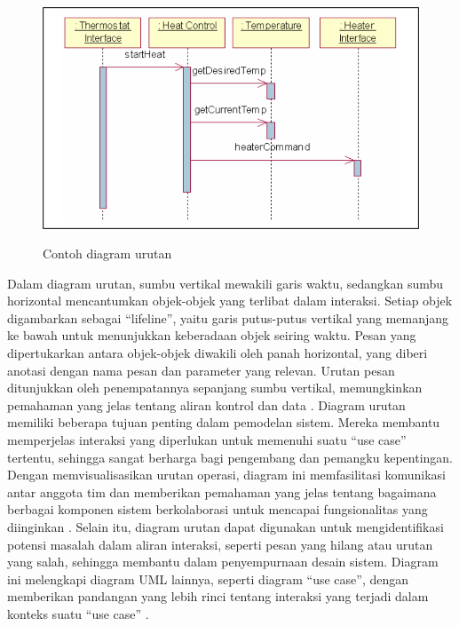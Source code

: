 \begin{figure}[htbp]
  \centering
  \includegraphics[width=0.85\linewidth]{images/bab-2/sequence.png}
  \caption{Contoh diagram urutan}\label{fig:sequence-diagram-example}\citep{huzar2005uml}
\end{figure}
\singlespacing{}
Dalam diagram urutan, sumbu vertikal mewakili garis waktu, sedangkan sumbu horizontal mencantumkan objek-objek yang terlibat dalam interaksi. Setiap objek digambarkan sebagai ``lifeline'', yaitu garis putus-putus vertikal yang memanjang ke bawah untuk menunjukkan keberadaan objek seiring waktu. Pesan yang dipertukarkan antara objek-objek diwakili oleh panah horizontal, yang diberi anotasi dengan nama pesan dan parameter yang relevan. Urutan pesan ditunjukkan oleh penempatannya sepanjang sumbu vertikal, memungkinkan pemahaman yang jelas tentang aliran kontrol dan data \citep{huzar2005uml}.
\singlespacing{}
Diagram urutan memiliki beberapa tujuan penting dalam pemodelan sistem. Mereka membantu memperjelas interaksi yang diperlukan untuk memenuhi suatu ``use case'' tertentu, sehingga sangat berharga bagi pengembang dan pemangku kepentingan. Dengan memvisualisasikan urutan operasi, diagram ini memfasilitasi komunikasi antar anggota tim dan memberikan pemahaman yang jelas tentang bagaimana berbagai komponen sistem berkolaborasi untuk mencapai fungsionalitas yang diinginkan \citep{huzar2005uml}.
\singlespacing{}
Selain itu, diagram urutan dapat digunakan untuk mengidentifikasi potensi masalah dalam aliran interaksi, seperti pesan yang hilang atau urutan yang salah, sehingga membantu dalam penyempurnaan desain sistem. Diagram ini melengkapi diagram UML lainnya, seperti diagram ``use case'', dengan memberikan pandangan yang lebih rinci tentang interaksi yang terjadi dalam konteks suatu ``use case'' \citep{huzar2005uml}.